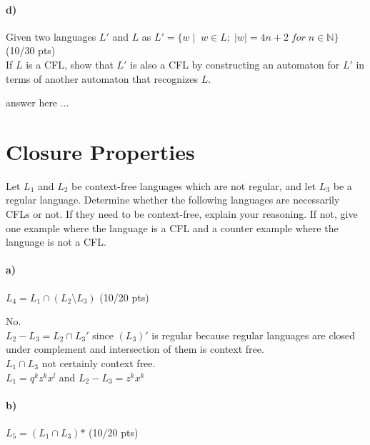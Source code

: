 \documentclass[a4paper,12pt]{article}
\begin{document}
\paragraph{d)} Given two languages $L'$ and $L$ as $L'=\{w \mid \; w\in L; \; |w|=4n+2 \; for\; n\in \mathbb{N} \}$
\hfill \small{(10/30 pts)} \\
If $L$ is a CFL, show that $L'$ is also a CFL by constructing an automaton for $L'$ in terms of another automaton that recognizes $L$. \\


\begin{tcolorbox}
 answer here ...
\vspace{8cm} %
\end{tcolorbox}






\newpage
\section{Closure Properties \hfill {}}

Let $L_1$ and $L_2$ be context-free languages which are not regular, and let $L_3$ be a regular language. Determine whether the following languages are necessarily CFLs or not. If they need to be context-free, explain your reasoning. If not, give one example where the language is a CFL and a counter example where the language is not a CFL. \\

\paragraph{a)} $L_4 = L_1 \cap (L_2 \setminus L_3)$ \hfill \small{(10/20 pts)} \\

\begin{tcolorbox}
No. \\ $L_2 - L_3 = L_2 \cap L_3'$   since $(L_3)'$ is regular because regular languages are closed under complement and intersection of them is context free. \\
$ L_1 \cap L_3$ not certainly context free. \\
$ L_1 = q^k z^k x^l $  and $L_2 - L_3 =z^k x^k $
\end{tcolorbox}

\paragraph{b)} $L_5 = (L_1 \cap L_3)\text{*}$ \hfill \small{(10/20 pts)} \\
\end{document}
